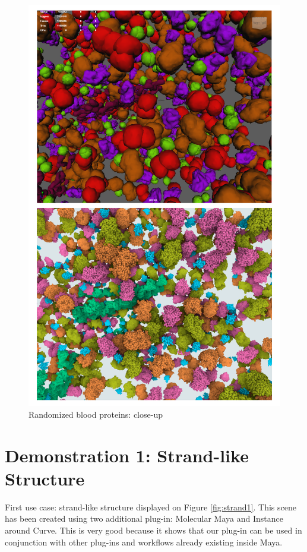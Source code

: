 \documentclass[
  digital, %
  table,   %
  nolof,     %
  nolot,     %
  oneside,
]{fithesis3}
\begin{document}
\begin{figure}
  \centering
  \includegraphics[scale=0.4]{images/demonstration/blood-closeup.png}
  \caption{Randomized blood proteins: close-up}
  \label{fig:blood-random-close}
\end{figure}

\section{Demonstration 1: Strand-like Structure}
First use case: strand-like structure displayed on Figure \ref{fig:strand1}. This scene has been created using two additional plug-in: Molecular Maya and Instance around Curve. This is very good because it shows that our plug-in can be used in conjunction with other plug-ins and workflows already existing inside Maya.
\end{document}
